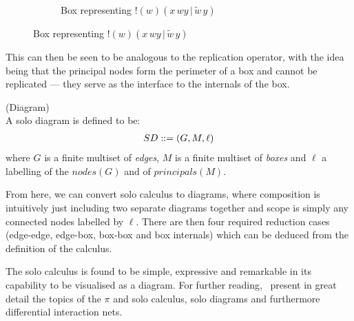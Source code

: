     \begin{figure}[H]
        \centering
        \begin{subfigure}{0.4\linewidth}
            \centering
            \caption*{Box representing $!(w)(x \, w y \, | \, \tilde{w} \, y)$}
        \end{subfigure}\footnotemark
    \end{figure}

    This can then be seen to be analogous to the replication operator, with the idea being that the principal nodes form the perimeter of a box and cannot be replicated --- they serve as the interface to the internals of the box.


    \begin{definition}{(Diagram)\\}
        A solo diagram is defined to be:
        \begin{align}
            SD ::= (G, M, \ell)
        \end{align}
        where $G$ is a finite multiset of \textit{edges}, $M$ is a finite multiset of \textit{boxes} and $\ell$ a labelling of the $nodes(G)$ and of $principals(M)$.
    \end{definition}
    From here, we can convert solo calculus to diagrams, where composition is intuitively just including two separate diagrams together and scope is simply any connected nodes labelled by $\ell$.
    There are then four required reduction cases (edge-edge, edge-box, box-box and box internals) which can be deduced from the definition of the calculus.


    \begin{remarks}
        The solo calculus is found to be simple, expressive and remarkable in its capability to be visualised as a diagram.
        For further reading,~\cite{acyclic-solos} present in great detail the topics of the $\pi$ and solo calculus, solo diagrams and furthermore differential interaction nets.
    \end{remarks}


